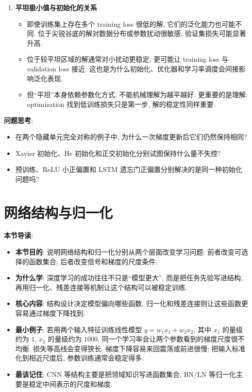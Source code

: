 \documentclass{../nndlcourse}
\begin{document}
\begin{enumerate}
\begin{itemize}
      \item 预训练的特殊之处在于它往往同时帮助 optimization 和 generalization. 它让优化从更好的区域开始, 也通过大规模数据让表示更稳定、更可迁移.
    \end{itemize}
  \item \textbf{平坦极小值与初始化的关系}
    \begin{itemize}
      \item 即使训练集上存在多个 training loss 很低的解, 它们的泛化能力也可能不同. 位于尖锐谷底的解对数据分布或参数扰动很敏感, 验证集损失可能显著升高.
      \item 位于较平坦区域的解通常对小扰动更稳定, 更可能让 training loss 与 validation loss 接近. 这也是为什么初始化、优化器和学习率调度会间接影响泛化表现.
      \item 但“平坦”本身依赖参数化方式, 不能机械理解为越平越好. 更重要的是理解: optimization 找到低训练损失只是第一步, 解的稳定性同样重要.
    \end{itemize}
\end{enumerate}

\textbf{问题思考}:
\begin{itemize}
  \item 在两个隐藏单元完全对称的例子中, 为什么一次梯度更新后它们仍然保持相同?
  \item Xavier 初始化、He 初始化和正交初始化分别试图保持什么量不失控?
  \item 预训练、ReLU 小正偏置和 LSTM 遗忘门正偏置分别解决的是同一种初始化问题吗?
\end{itemize}

\section{网络结构与归一化}

\textbf{本节导读}:
\begin{itemize}
  \item \textbf{本节目的}: 说明网络结构和归一化分别从两个层面改变学习问题: 前者改变可选择的函数集合, 后者改变信号和梯度的尺度条件.
  \item \textbf{为什么学}: 深度学习的成功往往不只是“模型更大”, 而是把任务先验写进结构, 再用归一化、残差连接等机制让这个结构可以被稳定训练.
  \item \textbf{核心内容}: 结构设计决定模型偏向哪些函数, 归一化和残差连接则让这些函数更容易通过梯度下降找到.
  \item \textbf{最小例子}: 若用两个输入特征训练线性模型 $y=w_1x_1+w_2x_2$, 其中 $x_1$ 的量级约为 $1$, $x_2$ 的量级约为 $1000$, 同一个学习率会让两个参数看到的梯度尺度很不均衡. 损失等高线会变得狭长, 梯度下降容易来回震荡或前进很慢; 把输入标准化到相近尺度后, 参数训练通常会稳定得多.
  \item \textbf{最该记住}: CNN 等结构主要是把领域知识写进函数集合, BN/LN 等归一化主要是稳定中间表示的尺度和梯度.
\end{itemize}
\end{document}
